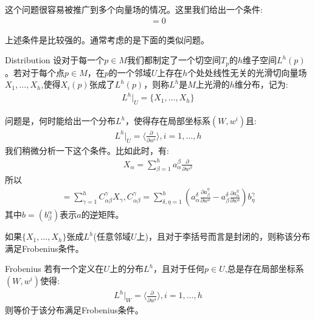 \documentclass{package/fancy-book}
\begin{document}
这个问题很容易被推广到多个向量场的情况。这里我们给出一个条件:
\begin{align}
    [X_\alpha,X_\beta]=0
\end{align}

上述条件是比较强的。通常考虑的是下面的类似问题。
\begin{definition}[Distribution]{Distribution}
    设对于每一个$p \in M$我们都制定了一个切空间$T_p$的$h$维子空间$L^h(p)$。若对于每个点$p \in M$，在$p$的一个邻域$U$上存在$h$个处处线性无关的光滑切向量场$X_1,\dots,X_h$,使得$X_i(p)$张成了$L^h(p)$，则称$L^h$是$M$上光滑的$h$维分布，记为:
\begin{align}
    L^h|_U=\{X_1,\dots,X_h\}
\end{align}
\end{definition}
问题是，何时能给出一个分布$L^h$，使得存在局部坐标系$(W,w^i)$且:
\begin{align}
    L^h|_U=\langle \frac{\partial}{\partial w^i}\rangle,i=1,\dots,h
\end{align}
我们稍微分析一下这个条件。比如此时，有:
\begin{align}
    X_\alpha=\sum_{\beta=1}^h a_\alpha^\beta \frac{\partial}{\partial w^\beta}
\end{align}
所以
\begin{align}
    [X_\alpha,X_\beta]=\sum_{\gamma=1}^h C_{\alpha\beta}^\gamma X_\gamma,C_{\alpha\beta}^\gamma=\sum_{\delta,\eta=1}^h(a_\alpha^\delta \frac{\partial a_\beta^\eta}{\partial w^\delta}-a_\beta^\delta\frac{\partial a_\alpha^\eta}{\partial w^\delta})b_\eta^\gamma
\end{align}
其中$b=(b_\beta^\alpha)$表示$a$的逆矩阵。
\begin{definition}[Frobenius条件]{}
    如果$\{X_1,\dots,X_h\}$张成$L^h$(任意邻域$U$上)，且对于李括号而言是封闭的，则称该分布满足Frobenius条件。
\end{definition}
\begin{theorem}[Frobenius定理]{Frobenius}
    若有一个定义在$U$上的分布$L^h$，且对于任何$p\in U$,总是存在局部坐标系$(W,w^i)$使得:
\begin{align}
    L^h|_W=\langle \frac{\partial}{\partial w^i}\rangle,i=1,\dots,h
\end{align}
则等价于该分布满足Frobenius条件。
\end{theorem}
\end{document}
